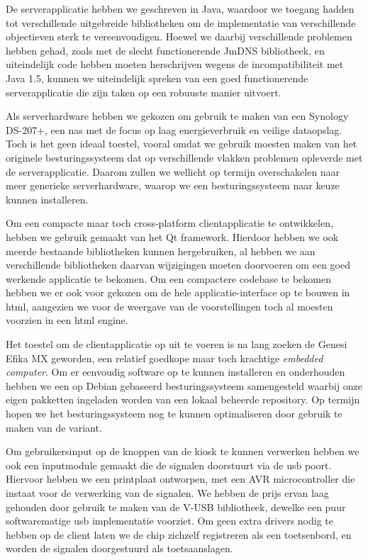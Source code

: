 De serverapplicatie hebben we geschreven in Java, waardoor we toegang hadden tot verschillende uitgebreide bibliotheken om de implementatie van verschillende objectieven sterk te vereenvoudigen. Hoewel we daarbij verschillende problemen hebben gehad, zoals met de slecht functionerende JmDNS bibliotheek, en uiteindelijk code hebben moeten herschrijven wegens de incompatibiliteit met Java 1.5, kunnen we uiteindelijk spreken van een goed functionerende serverapplicatie die zijn taken op een robuuste manier uitvoert.

Als serverhardware hebben we gekozen om gebruik te maken van een Synology DS-207+, een \ac{nas} met de focus op laag energieverbruik en veilige dataopslag. Toch is het geen ideaal toestel, vooral omdat we gebruik moesten maken van het originele besturingssysteem dat op verschillende vlakken problemen opleverde met de serverapplicatie. Daarom zullen we wellicht op termijn overschakelen naar meer generieke serverhardware, waarop we een besturingssysteem naar keuze kunnen installeren.

Om een compacte maar toch cross-platform clientapplicatie te ontwikkelen, hebben we gebruik gemaakt van het Qt framework. Hierdoor hebben we ook meerde bestaande bibliotheken kunnen hergebruiken, al hebben we aan verschillende bibliotheken daarvan wijzigingen moeten doorvoeren om een goed werkende applicatie te bekomen. Om een compactere codebase te bekomen hebben we er ook voor gekozen om de hele applicatie-interface op te bouwen in \ac{html}, aangezien we voor de weergave van de voorstellingen toch al moesten voorzien in een \ac{html} engine.

Het toestel om de clientapplicatie op uit te voeren is na lang zoeken de Genesi Efika MX geworden, een relatief goedkope maar toch krachtige \emph{embedded computer}. Om er eenvoudig software op te kunnen installeren en onderhouden hebben we een op Debian gebaseerd besturingssysteem samengesteld waarbij onze eigen pakketten ingeladen worden van een lokaal beheerde repository. Op termijn hopen we het besturingssysteem nog te kunnen optimaliseren door gebruik te maken van de  variant.

Om gebruikersinput op de knoppen van de kiosk te kunnen verwerken hebben we ook een inputmodule gemaakt die de signalen doorstuurt via de \ac{usb} poort. Hiervoor hebben we een printplaat ontworpen, met een AVR microcontroller die instaat voor de verwerking van de signalen. We hebben de prijs ervan laag gehouden door gebruik te maken van de V-USB bibliotheek, dewelke een puur softwarematige \ac{usb} implementatie voorziet. Om geen extra drivers nodig te hebben op de client laten we de chip zichzelf registreren als een toetsenbord, en worden de signalen doorgestuurd als toetsaanslagen.

